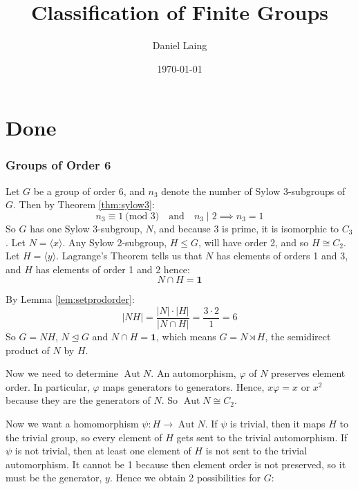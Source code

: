 \documentclass[a4paper, oneside, 12pt, final]{article}
\title{Classification of Finite Groups}
\author{Daniel Laing}
\date{\today}
\theoremstyle{definition}
\DeclareMathOperator{\Aut}{Aut}
\begin{document}
{\maketitle}
{\tableofcontents}

\part{Done}


\section{Groups of Order 6}
Let \(G\) be a group of order 6, and \(n_3\) denote the number of Sylow 3-subgroups of \(G\).
Then by Theorem \ref{thm:sylow3}:
\[n_3 \equiv 1 \ \text{(mod 3)} \quad \text{and} \quad n_3 \mid 2 \implies n_3 = 1\]
So \(G\) has one Sylow 3-subgroup, \(N\), and because 3 is prime, it is isomorphic to \(C_3\).
Let \(N = \langle x \rangle\).
Any Sylow 2-subgroup, \(H \leqslant G\), will have order 2, and so \(H \cong C_2\).
Let \(H = \langle y \rangle\).
Lagrange's Theorem tells us that \(N\) has elements of orders 1 and 3, and \(H\) has elements of
order 1 and 2 hence:
\[N \cap H = \bm{1}\]

By Lemma \ref{lem:setprodorder}:
\[|NH| = \frac{|N| \cdot |H|}{|N \cap H|} = \frac{3 \cdot 2}{1} = 6\]
So \(G = NH\), \(N \unlhd G\) and \(N \cap H = \bm{1}\), which means \(G = N \rtimes H\), the
semidirect product of \(N\) by \(H\).

Now we need to determine \(\Aut{N}\).
An automorphism, \(\varphi\) of \(N\) preserves element order.
In particular, \(\varphi\) maps generators to generators.
Hence, \(x\varphi = x\) or \(x^2\) because they are the generators of \(N\).
So \(\Aut{N} \cong C_2\).

Now we want a homomorphism \(\psi:H \to \Aut{N}\).
If \(\psi\) is trivial, then it maps \(H\) to the trivial group, so every element of \(H\) gets sent
to the trivial automorphism.
If \(\psi\) is not trivial, then at least one element of \(H\) is not sent to the trivial
automorphism.
It cannot be 1 because then element order is not preserved, so it must be the generator, \(y\).
Hence we obtain 2 possibilities for \(G\):
\end{document}
